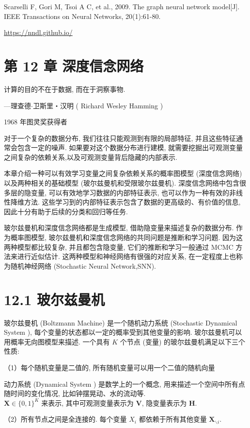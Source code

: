 \documentclass[10pt]{article}
\begin{document}
Scarselli F, Gori M, Tsoi A C, et al., 2009. The graph neural network model[J]. IEEE Transactions on Neural Networks, 20(1):61-80.

\href{https://nndl.github.io/}{https://nndl.github.io/}

\section*{第 12 章 深度信念网络}
计算的目的不在于数据, 而在于洞察事物.

—理查德$\cdot$卫斯里・汉明 ( Richard Wesley Hamming )

1968 年图灵奖获得者

对于一个复杂的数据分布, 我们往往只能观测到有限的局部特征, 并且这些特征通常会包含一定的噪声. 如果要对这个数据分布进行建模, 就需要挖掘出可观测变量之间复杂的依赖关系,以及可观测变量背后隐藏的内部表示.

本章介绍一种可以有效学习变量之间复杂依赖关系的概率图模型 (深度信念网络) 以及两种相关的基础模型 (玻尔兹曼机和受限玻尔兹曼机). 深度信念网络中包含很多层的隐变量, 可以有效地学习数据的内部特征表示, 也可以作为一种有效的非线性降维方法. 这些学习到的内部特征表示包含了数据的更高级的、有价值的信息, 因此十分有助于后续的分类和回归等任务.

玻尔兹曼机和深度信念网络都是生成模型, 借助隐变量来描述复杂的数据分布. 作为概率图模型, 玻尔兹曼机和深度信念网络的共同问题是推断和学习问题. 因为这两种模型都比较复杂, 并且都包含隐变量, 它们的推断和学习一般通过 MCMC 方法来进行近似估计. 这两种模型和神经网络有很强的对应关系, 在一定程度上也称为随机神经网络 (Stochastic Neural Network,SNN).

\section*{12.1 玻尔兹曼机}
玻尔兹曼机 (Boltzmann Machine) 是一个随机动力系统 (Stochastic Dynamical System ), 每个变量的状态都以一定的概率受到其他变量的影响. 玻尔兹曼机可以用概率无向图模型来描述. 一个具有 $K$ 个节点 (变量) 的玻尔兹曼机满足以下三个性质:

（1）每个随机变量是二值的, 所有随机变量可以用一个二值的随机向量

动力系统 (Dynamical System ) 是数学上的一个概念, 用来描述一个空间中所有点随时间的变化情况, 比如钟摆晃动、水的流动等.\\
$\boldsymbol{X} \in\{0,1\}^{K}$ 来表示, 其中可观测变量表示为 $\boldsymbol{V}$, 隐变量表示为 $\boldsymbol{H}$.

（2）所有节点之间是全连接的. 每个变量 $X_{i}$ 都依赖于所有其他变量 $\boldsymbol{X}_{\backslash i}$.
\end{document}
